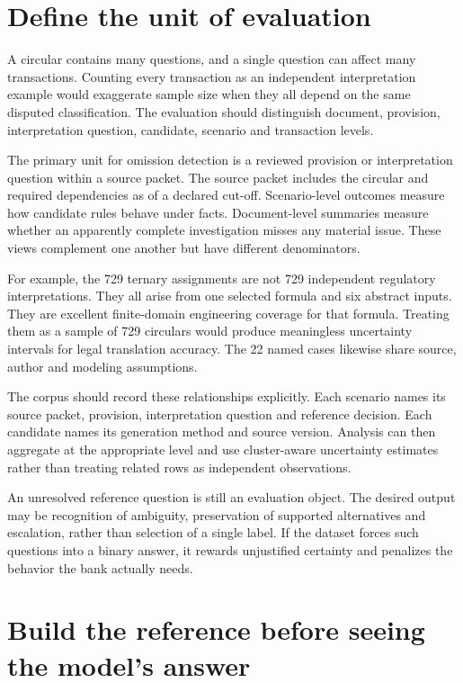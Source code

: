 \documentclass[12pt,a4paper,oneside,openany]{book}
\begin{document}
\section{Define the unit of evaluation}

A circular contains many questions, and a single question can affect many
transactions. Counting every transaction as an independent interpretation example
would exaggerate sample size when they all depend on the same disputed
classification. The evaluation should distinguish document, provision,
interpretation question, candidate, scenario and transaction levels.

The primary unit for omission detection is a reviewed provision or interpretation
question within a source packet. The source packet includes the circular and
required dependencies as of a declared cut-off. Scenario-level outcomes measure
how candidate rules behave under facts. Document-level summaries measure whether
an apparently complete investigation misses any material issue. These views
complement one another but have different denominators.

For example, the 729 ternary assignments are not 729 independent regulatory
interpretations. They all arise from one selected formula and six abstract inputs.
They are excellent finite-domain engineering coverage for that formula. Treating
them as a sample of 729 circulars would produce meaningless uncertainty intervals
for legal translation accuracy. The 22 named cases likewise share source,
author and modeling assumptions.

The corpus should record these relationships explicitly. Each scenario names its
source packet, provision, interpretation question and reference decision. Each
candidate names its generation method and source version. Analysis can then
aggregate at the appropriate level and use cluster-aware uncertainty estimates
rather than treating related rows as independent observations.

An unresolved reference question is still an evaluation object. The desired
output may be recognition of ambiguity, preservation of supported alternatives
and escalation, rather than selection of a single label. If the dataset forces
such questions into a binary answer, it rewards unjustified certainty and
penalizes the behavior the bank actually needs.

\section{Build the reference before seeing the model's answer}
\end{document}
